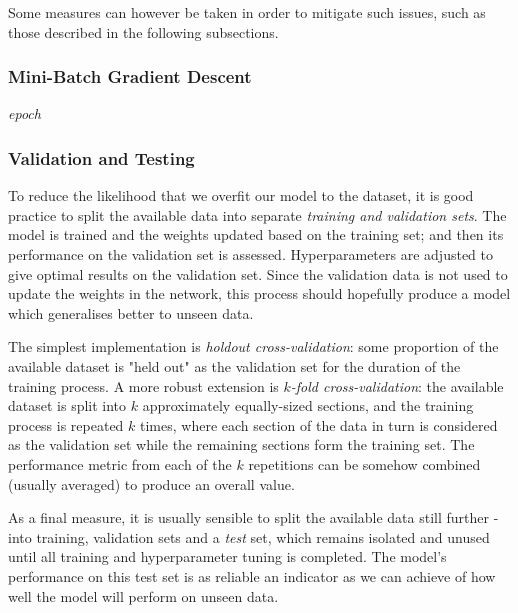 \documentclass{article}[11pt]
\begin{document}
        Some measures can however be taken in order to mitigate such issues, such as those described in the following subsections.        
        
        
        \subsubsection{Mini-Batch Gradient Descent}
            
            
            \textit{epoch}
            
            
            
        
        \subsubsection{Validation and Testing}
            
            To reduce the likelihood that we overfit our model to the dataset, it is good practice to split the available data into separate \textit{training and validation sets}. The model is trained and the weights updated based on the training set; and then its performance on the validation set is assessed. Hyperparameters are adjusted to give optimal results on the validation set. Since the validation data is not used to update the weights in the network, this process should hopefully produce a model which generalises better to unseen data.
            
            The simplest implementation is \textit{holdout cross-validation}: some proportion of the available dataset is "held out" as the validation set for the duration of the training process. A more robust extension is \textit{$k$-fold cross-validation}: the available dataset is split into $k$ approximately equally-sized sections, and the training process is repeated $k$ times, where each section of the data in turn is considered as the validation set while the remaining sections form the training set. The performance metric from each of the $k$ repetitions can be somehow combined (usually averaged) to produce an overall value.
            
            As a final measure, it is usually sensible to split the available data still further - into training, validation sets and a \textit{test} set, which remains isolated and unused until all training and hyperparameter tuning is completed. The model's performance on this test set is as reliable an indicator as we can achieve of how well the model will perform on unseen data.
            
\end{document}
